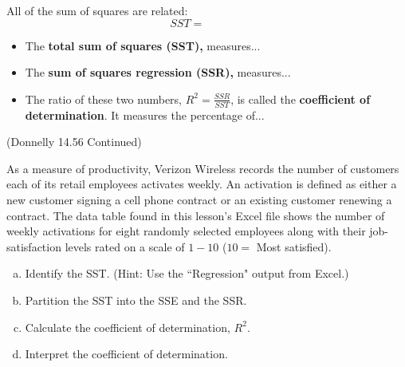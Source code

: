 \documentclass[12pt, letterpaper]{article}
\newcounter{exercise}
\theoremstyle{definition}
\begin{document}
\vfill


\begin{statement}
All of the sum of squares are related:
$$ SST = ~~~~~~~~~~~~~~~~ $$

\vspace*{.1in}
\begin{itemize}

\item The \textbf{total sum of squares (SST),} measures...
\vspace*{.8in}

\item The \textbf{sum of squares regression (SSR),} measures...
\vspace*{.8in}

\item The ratio of these two numbers, $R^2 = \frac{SSR}{SST}$, is called the \textbf{coefficient of determination}.  It measures the percentage of...
\vspace*{1in} 


\end{itemize}
\end{statement}

\vfill

\newpage

\begin{exercise} (Donnelly 14.56 Continued)

As a measure of productivity, Verizon Wireless records the number of customers each of its retail employees activates weekly.  An activation is defined as either a new customer signing a cell phone contract or an existing customer renewing a contract.  The data table found in this lesson's Excel file shows the number of weekly activations for eight randomly selected employees along with their job-satisfaction levels rated on a scale of $1-10$ ($10=$ Most satisfied).

\end{exercise}

\begin{enumerate}[(a)]

\item Identify the SST.  (Hint:  Use the ``Regression" output from Excel.)

\vfill

\item Partition the SST into the SSE and the SSR.

\vfill

\item Calculate the coefficient of determination, $R^2$.

\vfill

\item Interpret the coefficient of determination.

\vfill

\end{enumerate}
\end{document}
